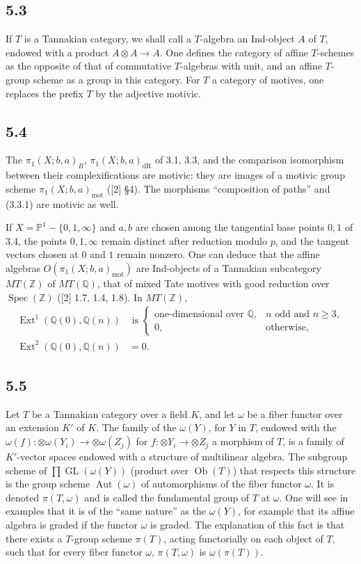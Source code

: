 \documentclass[11pt]{article}
\newcommand{\Q}{\mathbb Q}
\newcommand{\Z}{\mathbb Z}
\newcommand{\PP}{\mathbb P}
\newcommand{\Spec}{\operatorname{Spec}}
\newcommand{\Ext}{\operatorname{Ext}}
\newcommand{\Aut}{\operatorname{Aut}}
\newcommand{\GL}{\operatorname{GL}}
\newcommand{\Ob}{\operatorname{Ob}}
\newcommand{\dR}{\mathrm{dR}}
\newcommand{\mot}{\mathrm{mot}}
\begin{document}
\subsection*{5.3}
If $T$ is a Tannakian category, we shall call a $T$-algebra an Ind-object $A$ of $T$, endowed with a product $A\otimes A\to A$.
One defines the category of affine $T$-schemes as the opposite of that of commutative $T$-algebras with unit, and an affine $T$-group scheme as a group in this category.
For $T$ a category of motives, one replaces the prefix $T$ by the adjective motivic.

\subsection*{5.4}
The $\pi_1(X;b,a)_B$, $\pi_1(X;b,a)_{\dR}$ of 3.1, 3.3, and the comparison isomorphism between their complexifications are motivic: they are images of a motivic group scheme $\pi_1(X;b,a)_{\mot}$ ([2] \S4).
The morphisms ``composition of paths'' and (3.3.1) are motivic as well.

If $X=\PP^1-\{0,1,\infty\}$ and $a,b$ are chosen among the tangential base points $0,1$ of 3.4, the points $0,1,\infty$ remain distinct after reduction modulo $p$, and the tangent vectors chosen at $0$ and $1$ remain nonzero.
One can deduce that the affine algebras $O(\pi_1(X;b,a)_{\mot})$ are Ind-objects of a Tannakian subcategory $MT(\Z)$ of $MT(\Q)$, that of mixed Tate motives with good reduction over $\Spec(\Z)$ ([2] 1.7, 1.4, 1.8).
In $MT(\Z)$,
\begin{align}
 \Ext^1(\Q(0),\Q(n))&\text{ is }
 \begin{cases}
 \text{one-dimensional over }\Q,& n\text{ odd and }n\geq3,\\
 0,&\text{otherwise,}
 \end{cases}
\tag{5.4.1}\\
 \Ext^2(\Q(0),\Q(n))&=0.
\tag{5.4.2}
\end{align}

\subsection*{5.5}
Let $T$ be a Tannakian category over a field $K$, and let $\omega$ be a fiber functor over an extension $K'$ of $K$.
The family of the $\omega(Y)$, for $Y$ in $T$, endowed with the $\omega(f):\otimes\omega(Y_i)\to\otimes\omega(Z_j)$ for $f:\otimes Y_i\to\otimes Z_j$ a morphism of $T$, is a family of $K'$-vector spaces endowed with a structure of multilinear algebra.
The subgroup scheme of $\prod \GL(\omega(Y))$ (product over $\Ob(T)$) that respects this structure is the group scheme $\Aut(\omega)$ of automorphisms of the fiber functor $\omega$.
It is denoted $\pi(T,\omega)$ and is called the fundamental group of $T$ at $\omega$.
One will see in examples that it is of the ``same nature'' as the $\omega(Y)$, for example that its affine algebra is graded if the functor $\omega$ is graded.
The explanation of this fact is that there exists a $T$-group scheme $\pi(T)$, acting functorially on each object of $T$, such that for every fiber functor $\omega$, $\pi(T,\omega)$ is $\omega(\pi(T))$.
\end{document}
